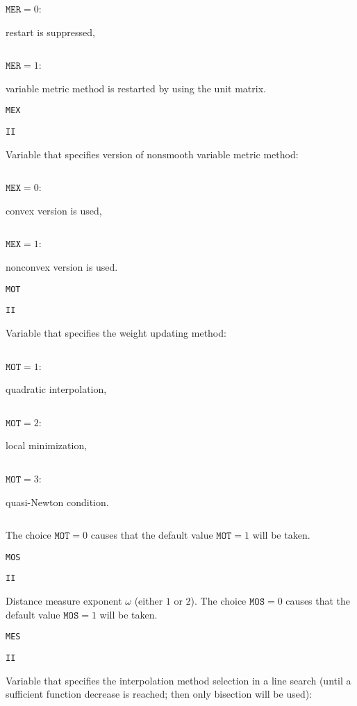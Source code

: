 \documentclass{article}
\begin{document}
{\noindent\parbox{30mm}{$\;$}\parbox{20mm}{$\texttt{MER}=0$:}\parbox[t]{71mm}{
  restart is suppressed,}
  \par
\noindent\parbox{30mm}{$\;$}\parbox{20mm}{$\texttt{MER}=1$:}\parbox[t]{71mm}{
  variable metric method is restarted by using the unit matrix.}
  \par\vspace{1mm}
\noindent\parbox{20mm}{\texttt{MEX}}\parbox{10mm}{\texttt{II}}\parbox[t]{91mm}{
  Variable that specifies version of nonsmooth variable metric method:}
  \par\vspace{1mm}
\noindent\parbox{30mm}{$\;$}\parbox{20mm}{$\texttt{MEX}=0$:}\parbox[t]{71mm}{
  convex version is used,}
  \par
\noindent\parbox{30mm}{$\;$}\parbox{20mm}{$\texttt{MEX}=1$:}\parbox[t]{71mm}{
  nonconvex version is used.}
  \par\vspace{1mm}
\noindent\parbox{20mm}{\texttt{MOT}}\parbox{10mm}{\texttt{II}}\parbox[t]{91mm}{
  Variable that specifies the weight updating method:}
  \par\vspace{1mm}
\noindent\parbox{30mm}{$\;$}\parbox{20mm}{$\texttt{MOT}=1$:}\parbox[t]{71mm}{
  quadratic interpolation,}
  \par
\noindent\parbox{30mm}{$\;$}\parbox{20mm}{$\texttt{MOT}=2$:}\parbox[t]{71mm}{
  local minimization,}
  \par
\noindent\parbox{30mm}{$\;$}\parbox{20mm}{$\texttt{MOT}=3$:}\parbox[t]{71mm}{
  quasi-Newton condition.}
  \par\vspace{1mm}
\noindent\parbox{30mm}{$\;$}\parbox[t]{91mm}{The choice $\texttt{MOT}=0$
  causes that the default value $\texttt{MOT}=1$ will be taken.}
  \par\vspace{2mm}
\noindent\parbox{20mm}{\texttt{MOS}}\parbox{10mm}{\texttt{II}}\parbox[t]{91mm}{
  Distance measure exponent $\omega$ (either $1$ or $2$). The choice
  $\texttt{MOS}=0$ causes that the default value $\texttt{MOS}=1$ will be taken.}
  \par\vspace{2mm}
\noindent\parbox{20mm}{\texttt{MES}}\parbox{10mm}{\texttt{II}}\parbox[t]{91mm}{
  Variable that specifies the interpolation method selection in a
  line search (until a sufficient function decrease is reached; then only
  bisection will be used):}
  \par\vspace{1mm}
}
\end{document}
